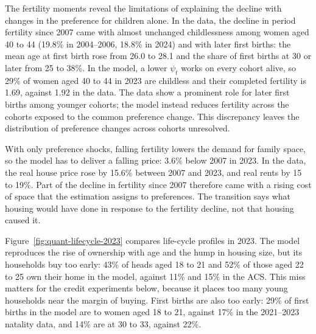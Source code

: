 
The fertility moments reveal the limitations of explaining the decline with
changes in the preference for children alone. In the data, the decline
in period fertility since 2007 came with almost unchanged childlessness among
women aged 40 to 44 (19.8\% in 2004--2006, 18.8\% in 2024) and
with later first births: the mean age at first birth rose from 26.0 to 28.1
and the share of first births at 30 or later from 25 to 38\%. In the
model, a lower $\psi_t$ works on every cohort alive, so 29\% of women
aged 40 to 44 in 2023 are childless and their completed fertility is 1.69,
against 1.92 in the data. The data
show a prominent role for later first births among younger cohorts; the
model instead reduces fertility across the cohorts exposed to the common
preference change. This discrepancy leaves the distribution of preference changes across
cohorts unresolved.

With only preference shocks,
falling fertility lowers the demand for family space, so the model has to
deliver a falling price: 3.6\% below 2007 in 2023. In the data, the real
house price rose by 15.6\% between 2007 and 2023, and real rents by 15
to 19\%. Part of the decline in fertility since 2007 therefore came with
a rising cost of space that the estimation assigns to preferences. The
transition says what housing would have done in response to the fertility
decline, not that housing caused it.

Figure~\ref{fig:quant-lifecycle-2023} compares life-cycle profiles in 2023.
The model reproduces the rise of ownership with age and the hump in housing
size, but its households buy too early: 43\% of heads aged 18
to 21 and 52\% of those aged 22 to 25 own their home in the
model, against 11\% and 15\% in the ACS. This miss matters
for the credit experiments below, because it places too many young households
near the margin of buying. First births are also too early:
29\% of first births in the model are to women aged 18 to 21,
against 17\% in the 2021--2023 natality data, and 14\% are at
30 to 33, against 22\%.

